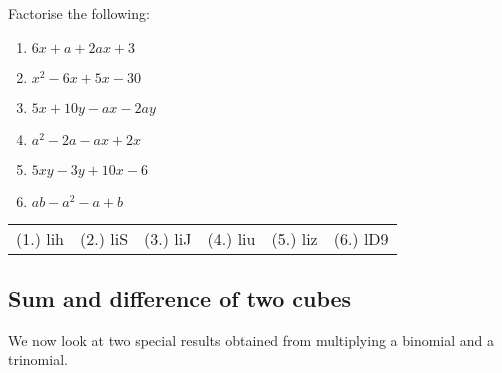 


\begin{exercises}{}{
\nopagebreak
Factorise the following:
\begin{multicols}{2}
\begin{enumerate}[itemsep=5pt, label=\textbf{\arabic*}. ] 
\item $6x+a+2ax+3$
\item ${x}^{2}-6x+5x-30$
\item $5x+10y-ax-2ay$
\item ${a}^{2}-2a-ax+2x$
\item $5xy-3y+10x-6$
\item $ab - a^{2} - a + b$
\end{enumerate}
\end{multicols}
\practiceinfo 
\par 
\par \begin{tabular}[h]{cccccc}
(1.) lih  &  (2.) liS  &  (3.) liJ  &  (4.) liu  &  (5.) liz  & (6.) lD9 \end{tabular}
}
\end{exercises}


\subsection*{Sum and difference of two cubes}      
We now look at two special results obtained from multiplying a binomial and a trinomial. 

